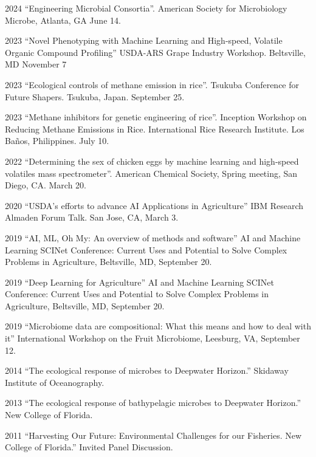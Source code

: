\documentclass[12pt,letterpaper]{report}
\begin{document}
    \begin{tablist}
    	\item[2024] \tab \enquote{Engineering Microbial Consortia}. American Society for Microbiology Microbe, Atlanta, GA June 14.
	\item[2023]\tab \enquote{Novel Phenotyping with Machine Learning and High-speed, Volatile Organic Compound Profiling} USDA-ARS Grape Industry Workshop. Beltsville, MD November 7
    	\item[2023 ] \tab \enquote{Ecological controls of methane emission in rice}. Tsukuba Conference for Future Shapers.  Tsukuba, Japan. September 25.
    	\item[2023 ] \tab \enquote{Methane inhibitors for genetic engineering of rice}. Inception Workshop on Reducing Methane Emissions in Rice. International Rice Research Institute. Los Ba\~{n}os, Philippines. July 10.
    	\item[2022] \tab \enquote{Determining the sex of chicken eggs by machine learning and high-speed volatiles mass spectrometer}. American Chemical Society, Spring meeting, San Diego, CA. March 20.
    	\item[2020] \tab \enquote{USDA's efforts to advance AI Applications in Agriculture} IBM Research Almaden Forum Talk. San Jose, CA,  March 3.

        \item[2019] \tab \enquote{AI, ML, Oh My: An overview of methods and software}  AI and Machine Learning SCINet Conference:  Current Uses and Potential to Solve Complex Problems in Agriculture, Beltsville, MD, September 20.
        
        \item[2019] \tab \enquote{Deep Learning for Agriculture} AI and Machine Learning SCINet Conference:  Current Uses and Potential to Solve Complex Problems in Agriculture,  Beltsville, MD, September 20.
        
        \item[2019] \tab \enquote{Microbiome data are compositional: What this means and how to deal with it} International Workshop on the Fruit Microbiome,  Leesburg, VA, September 12.
        \item[2014] \tab \enquote{The ecological response of microbes to Deepwater Horizon.} Skidaway Institute of Oceanography. 
        \item[2013] \tab \enquote{The ecological response of bathypelagic microbes to Deepwater Horizon.} New College of Florida.
        \item[2011] \tab \enquote{Harvesting Our Future: Environmental Challenges for our Fisheries. New College of Florida.} Invited Panel Discussion.


        
       \end{tablist}
\end{document}
